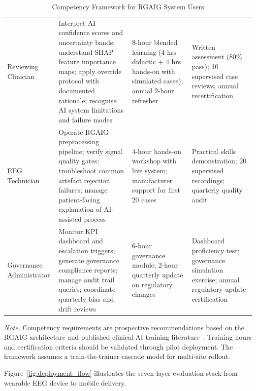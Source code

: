 \begin{table}[H]
\tablestripes
\tablefontsize
\caption[Clinical AI Competency Framework]{Competency Framework for RGAIG System Users}
\begin{tabularx}{\textwidth}{@{} p{1.8cm} L L p{2cm} @{}}
\toprule
{} &  &  &  \\
\midrule
Reviewing Clinician & Interpret AI confidence scores and uncertainty bands; understand SHAP feature importance maps; apply override protocol with documented rationale; recognise AI system limitations and failure modes & 8-hour blended learning (4 hrs didactic + 4 hrs hands-on with simulated cases); annual 2-hour refresher & Written assessment (80\% pass); 10 supervised case reviews; annual recertification \\
\addlinespace
EEG Technician & Operate RGAIG preprocessing pipeline; verify signal quality gates; troubleshoot common artefact rejection failures; manage patient-facing explanation of AI-assisted process & 4-hour hands-on workshop with live system; manufacturer support for first 20 cases & Practical skills demonstration; 20 supervised recordings; quarterly quality audit \\
\addlinespace
Governance Administrator & Monitor KPI dashboard and escalation triggers; generate governance compliance reports; manage audit trail queries; coordinate quarterly bias and drift reviews & 6-hour governance module; 2-hour quarterly update on regulatory changes & Dashboard proficiency test; governance simulation exercise; annual regulatory update certification \\
\bottomrule
\end{tabularx}
\vspace{0.5em}\noindent\textit{Note.} Competency requirements are prospective recommendations based on the RGAIG architecture and published clinical AI training literature~\cite{topol2019deep}. Training hours and certification criteria should be validated through pilot deployment. The framework assumes a train-the-trainer cascade model for multi-site rollout.
\end{table}

\noindent Figure~\ref{fig:deployment_flow} illustrates the seven-layer evaluation stack from wearable EEG device to mobile delivery.

